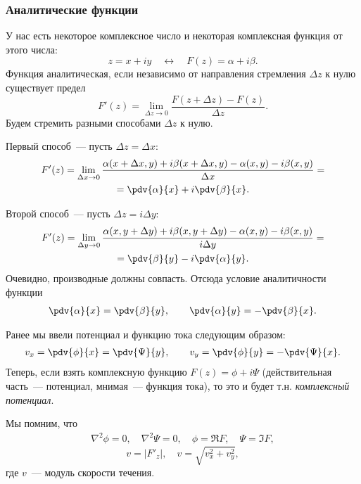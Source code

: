 \subsubsection{Аналитические функции}

У нас есть некоторое комплексное число и некоторая комплексная функция от этого числа:
\begin{equation}
	z=x+iy
	\quad \leftrightarrow \quad
	F(z)=\alpha+i \beta.
\end{equation}
Функция аналитическая, если независимо от направления стремления $\Delta z$ к нулю существует предел
\begin{equation}
	F'(z)=\lim\limits_{\Delta z\to0}\frac{F(z+\Delta z)-F(z)}{\Delta z}.
\end{equation}
Будем стремить разными способами $\Delta z$ к нулю.

Первый способ~--- пусть $\Delta z = \Delta x$:
\begin{multline}
	F'(z)=\lim\limits_{\Delta x\to0}\frac{\alpha(x+\Delta x,y)+i\beta(x+\Delta x,y)-\alpha(x,y)-i\beta(x,y)}{\Delta x}=\\=
		\pdv{\alpha}{x}+i\pdv{\beta}{x}.
\end{multline}

Второй способ~--- пусть $\Delta z=i\Delta y$:
\begin{multline}
	F'(z)=\lim\limits_{\Delta y\to0}\frac{\alpha(x,y+\Delta y)+i\beta(x,y+\Delta y)-\alpha(x,y)-i\beta(x,y)}{i\Delta y}=\\=
		\pdv{\beta}{y}-i\pdv{\alpha}{y}.
\end{multline}
Очевидно, производные должны совпасть. Отсюда условие аналитичности функции
\begin{gather}
	\label{eq2}
	\pdv{\alpha}{x}=\pdv{\beta}{y}, \qquad
	\pdv{\alpha}{y}=-\pdv{\beta}{x}.
\end{gather}

Ранее мы ввели потенциал и функцию тока следующим образом:
\begin{gather}
	\label{eq3}
	v_x=\pdv{\phi}{x}=\pdv{\Psi}{y}, \qquad
	v_y=\pdv{\phi}{y}=-\pdv{\Psi}{x}.
\end{gather}
Теперь, если взять комплексную функцию $F(z)=\phi+i\Psi$ (действительная часть~--- потенциал, мнимая~---  функция тока), то это и будет т.н. \textit{комплексный потенциал}.

Мы помним, что
\begin{gather}
	\nabla^2\phi=0,\quad
	\nabla^2\Psi=0,\quad
	\phi=\Re{F},\quad
	\Psi=\Im{F},
\end{gather}
\begin{equation}
	v=|F'_z|, \quad
	v=\sqrt{v_x^2+v_y^2},
\end{equation}
где $v$~---  модуль скорости течения.

